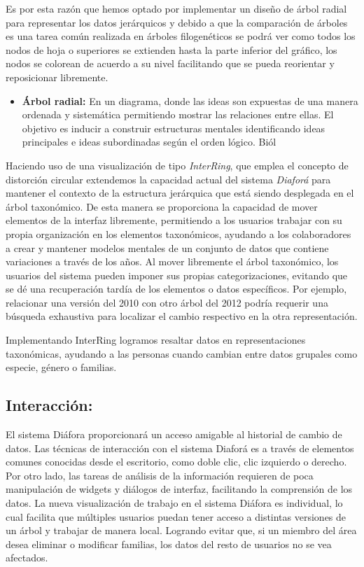 \documentclass[journal]{IEEEtran}
\begin{document}
Es por esta razón que hemos optado por implementar un diseño de árbol radial  \cite{sancho-study} para representar los datos jerárquicos y debido a que la comparación de árboles es una tarea común realizada en árboles filogenéticos se podrá ver como todos los nodos de hoja o superiores se extienden hasta la parte inferior del gráfico, 
los nodos se colorean de acuerdo a su nivel facilitando que se pueda reorientar y reposicionar libremente. 


\begin{itemize}
  \item \textbf{Árbol radial:} En un diagrama, donde las ideas son expuestas de una manera ordenada y sistemática permitiendo mostrar las relaciones entre ellas. \cite{book_keshary_2001}
  El objetivo es inducir a construir estructuras mentales identificando ideas principales e ideas subordinadas según el orden lógico. Biól
\end{itemize}


Haciendo uso de una visualización de tipo \emph{InterRing}\cite{yang_ward_rundensteiner}, que emplea
el concepto de distorción circular extendemos la capacidad actual del sistema \emph{Diaforá} para mantener el contexto
de la estructura jerárquica que está siendo desplegada en el árbol taxonómico. De esta manera se proporciona la capacidad de mover elementos de la interfaz libremente, permitiendo a los usuarios trabajar con su propia organización en los elementos taxonómicos, ayudando a los colaboradores a crear y mantener modelos mentales de un conjunto de datos que contiene variaciones a través de los años. 
Al mover libremente el árbol taxonómico, los usuarios del sistema pueden imponer sus propias categorizaciones, evitando que se dé una recuperación tardía de los elementos o datos específicos. Por ejemplo, relacionar una versión del 2010 con otro árbol del 2012 podría requerir una búsqueda exhaustiva para localizar el cambio respectivo en la otra representación. 

Implementando InterRing logramos resaltar datos en representaciones taxonómicas, ayudando a las personas cuando cambian entre datos grupales como especie, género o familias.

\subsection{Interacción: }
El sistema Diáfora proporcionará un acceso amigable al historial de cambio de datos. Las técnicas de interacción con el sistema Diaforá es a través de elementos comunes
conocidas desde el escritorio, como doble clic, clic izquierdo o derecho. Por otro lado, las tareas de análisis de la información requieren de poca manipulación de widgets y diálogos de interfaz, facilitando la comprensión de los datos. 
La nueva visualización de trabajo en el sistema Diáfora es individual, lo cual facilita que múltiples usuarios puedan tener acceso a distintas versiones de un árbol y trabajar de manera local. Logrando evitar que, si un miembro del área desea eliminar o modificar familias, los datos del resto de usuarios no se vea afectados.
\end{document}
